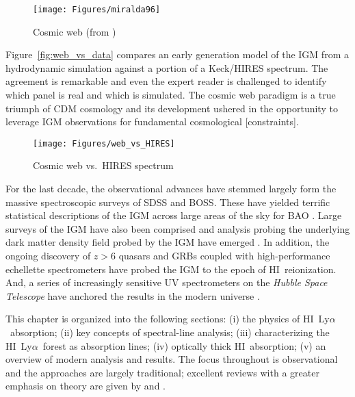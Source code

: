 \documentclass[graybox]{svmult}
\newcommand{\HI}{H{\sc I}}
\def\lya{Ly$\alpha$}
\begin{document}
%
\begin{figure}[b]
\sidecaption
\texttt{[image: Figures/miralda96]}
%
%
\caption{Cosmic web (from \cite{mco+96})
}
\label{fig:web}       %
\end{figure}


Figure~\ref{fig:web_vs_data} compares an early generation
model of the IGM from a hydrodynamic simulation 
against a portion of a Keck/HIRES spectrum.  The
agreement is remarkable and even the expert reader
is challenged to identify which panel is real and
which is simulated.
The cosmic web paradigm is a true triumph of CDM
cosmology and its development ushered in the 
opportunity to leverage IGM observations for fundamental
cosmological [constraints].

%
\begin{figure}[b]
\sidecaption
\texttt{[image: Figures/web\_vs\_HIRES]}
%
%
\caption{Cosmic web vs.\ HIRES spectrum
}
\label{fig:web_vs_HIRES}       %
\end{figure}


For the last decade, the observational advances
have stemmed largely form the massive spectroscopic
surveys of SDSS and BOSS.
These have yielded terrific statistical descriptions
of the IGM \cite{lee+15} 
across large areas of the sky for BAO \cite{busca13}.
Large surveys of the IGM have also been comprised
\cite{phw05,pow10,noterdaeme+12} and
analysis probing the underlying dark matter density
field probed by the IGM have emerged \cite{font12}.
In addition, the ongoing discovery of $z>6$ quasars 
and GRBs coupled with high-performance echellette
spectrometers have probed the IGM to the epoch
of \HI\ reionization.  And, a series of increasingly
sensitive UV spectrometers on the
{\it Hubble Space Telescope}
have anchored the results in the modern universe
\cite{pss00,dt01}.

This chapter is organized into the following sections:
 (i) the physics of \HI\ \lya\ absorption;
 (ii) key concepts of spectral-line analysis;
 (iii) characterizing the \HI\ \lya\ forest as absorption lines;
 (iv) optically thick \HI\ absorption;
 (v) an overview of modern analysis and results.
The focus throughout is observational and the approaches
are largely traditional;  excellent reviews with a greater
emphasis on theory are given by \cite{meiksin09} and
\cite{mcquinn16}.  
\end{document}

